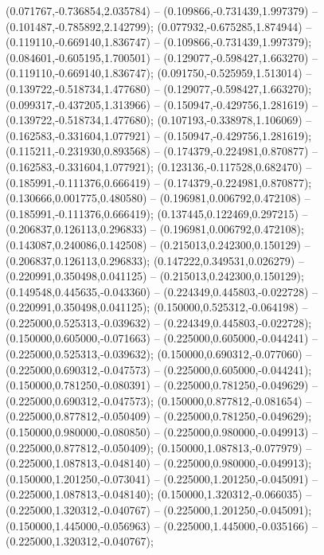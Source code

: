  (0.071767,-0.736854,2.035784) -- (0.109866,-0.731439,1.997379) -- (0.101487,-0.785892,2.142799);
 (0.077932,-0.675285,1.874944) -- (0.119110,-0.669140,1.836747) -- (0.109866,-0.731439,1.997379);
 (0.084601,-0.605195,1.700501) -- (0.129077,-0.598427,1.663270) -- (0.119110,-0.669140,1.836747);
 (0.091750,-0.525959,1.513014) -- (0.139722,-0.518734,1.477680) -- (0.129077,-0.598427,1.663270);
 (0.099317,-0.437205,1.313966) -- (0.150947,-0.429756,1.281619) -- (0.139722,-0.518734,1.477680);
 (0.107193,-0.338978,1.106069) -- (0.162583,-0.331604,1.077921) -- (0.150947,-0.429756,1.281619);
 (0.115211,-0.231930,0.893568) -- (0.174379,-0.224981,0.870877) -- (0.162583,-0.331604,1.077921);
 (0.123136,-0.117528,0.682470) -- (0.185991,-0.111376,0.666419) -- (0.174379,-0.224981,0.870877);
 (0.130666,0.001775,0.480580) -- (0.196981,0.006792,0.472108) -- (0.185991,-0.111376,0.666419);
 (0.137445,0.122469,0.297215) -- (0.206837,0.126113,0.296833) -- (0.196981,0.006792,0.472108);
 (0.143087,0.240086,0.142508) -- (0.215013,0.242300,0.150129) -- (0.206837,0.126113,0.296833);
 (0.147222,0.349531,0.026279) -- (0.220991,0.350498,0.041125) -- (0.215013,0.242300,0.150129);
 (0.149548,0.445635,-0.043360) -- (0.224349,0.445803,-0.022728) -- (0.220991,0.350498,0.041125);
 (0.150000,0.525312,-0.064198) -- (0.225000,0.525313,-0.039632) -- (0.224349,0.445803,-0.022728);
 (0.150000,0.605000,-0.071663) -- (0.225000,0.605000,-0.044241) -- (0.225000,0.525313,-0.039632);
 (0.150000,0.690312,-0.077060) -- (0.225000,0.690312,-0.047573) -- (0.225000,0.605000,-0.044241);
 (0.150000,0.781250,-0.080391) -- (0.225000,0.781250,-0.049629) -- (0.225000,0.690312,-0.047573);
 (0.150000,0.877812,-0.081654) -- (0.225000,0.877812,-0.050409) -- (0.225000,0.781250,-0.049629);
 (0.150000,0.980000,-0.080850) -- (0.225000,0.980000,-0.049913) -- (0.225000,0.877812,-0.050409);
 (0.150000,1.087813,-0.077979) -- (0.225000,1.087813,-0.048140) -- (0.225000,0.980000,-0.049913);
 (0.150000,1.201250,-0.073041) -- (0.225000,1.201250,-0.045091) -- (0.225000,1.087813,-0.048140);
 (0.150000,1.320312,-0.066035) -- (0.225000,1.320312,-0.040767) -- (0.225000,1.201250,-0.045091);
 (0.150000,1.445000,-0.056963) -- (0.225000,1.445000,-0.035166) -- (0.225000,1.320312,-0.040767);
